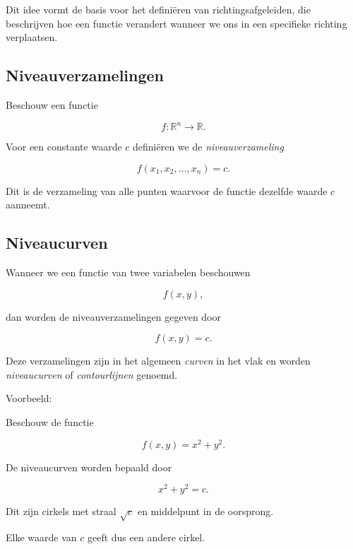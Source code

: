\documentclass[11pt,a4paper]{article}
\begin{document}
    Dit idee vormt de basis voor het definiëren van richtingsafgeleiden,
    die beschrijven hoe een functie verandert wanneer we ons in een
    specifieke richting verplaatsen.

    \subsection{Niveauverzamelingen}

    Beschouw een functie

    \[
        f : \mathbb{R}^n \rightarrow \mathbb{R}.
    \]

    Voor een constante waarde $c$ definiëren we de \textit{niveauverzameling}

    \[
        f(x_1, x_2, \ldots, x_n) = c.
    \]

    Dit is de verzameling van alle punten waarvoor de functie dezelfde waarde
    $c$ aanneemt.

    \subsection{Niveaucurven}

    Wanneer we een functie van twee variabelen beschouwen

    \[
        f(x,y),
    \]

    dan worden de niveauverzamelingen gegeven door

    \[
        f(x,y) = c.
    \]

    Deze verzamelingen zijn in het algemeen \textit{curven} in het vlak en worden
    \textit{niveaucurven} of \textit{contourlijnen} genoemd.

    Voorbeeld:

    Beschouw de functie

    \[
        f(x,y) = x^2 + y^2.
    \]

    De niveaucurven worden bepaald door

    \[
        x^2 + y^2 = c.
    \]

    Dit zijn cirkels met straal $\sqrt{c}$ en middelpunt in de oorsprong.

    Elke waarde van $c$ geeft dus een andere cirkel.
\end{document}
